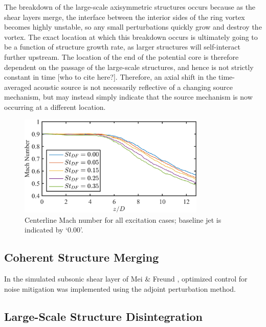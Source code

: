 The breakdown of the large-scale axisymmetric structures occurs because as the shear layers merge, the interface between the interior sides of the ring vortex becomes highly unstable, so any small perturbations quickly grow and destroy the vortex.
The exact location at which this breakdown occurs is ultimately going to be a function of structure growth rate, as larger structures will self-interact further upstream.
The location of the end of the potential core is therefore dependent on the passage of the large-scale structures, and hence is not strictly constant in time [who to cite here?].
Therefore, an axial shift in the time-averaged acoustic source is not necessarily reflective of a changing source mechanism, but may instead simply indicate that the source mechanism is now occurring at a different location.
\begin{figure}
	\centering
	\includegraphics[width = 3.5in]{Figures/ch4_centerlineMach.png}
	\caption{Centerline Mach number for all excitation cases; baseline jet is indicated by `0.00'.}
	\label{fig:ch4_centerlinemach}
\end{figure}

\subsection{Coherent Structure Merging}
In the simulated subsonic shear layer of Mei \& Freund \citep{Mei2005}, optimized control for noise mitigation was implemented using the adjoint perturbation method.
 

\subsection{Large-Scale Structure Disintegration}